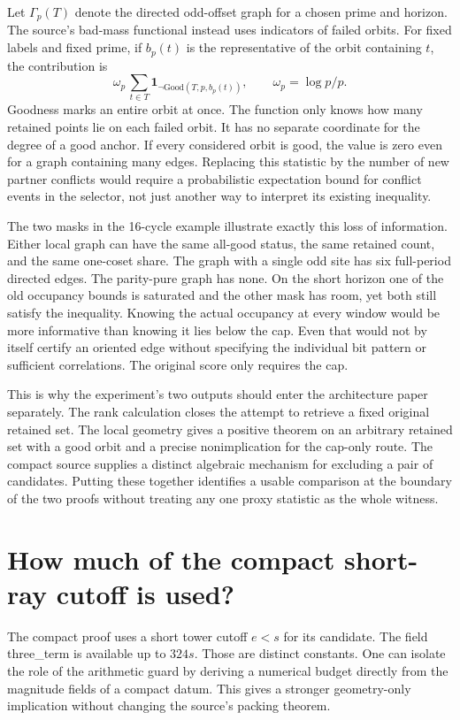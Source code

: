 \documentclass[12pt,letterpaper]{article}
\DeclareRobustCommand{\id}[1]{\mbox{\small\ttfamily #1}}
\begin{document}
Let \(\Gamma_p(T)\) denote the directed odd-offset graph for a chosen prime and horizon. The source's bad-mass functional instead uses indicators of failed orbits. For fixed labels and fixed prime, if \(b_p(t)\) is the representative of the orbit containing \(t\), the contribution is
\[
   \omega_p\,\sum_{t\in T}
                \mathbf1_{\neg\mathrm{Good}(T,p,b_p(t))},
                \qquad \omega_p=\log p/p .
\]
Goodness marks an entire orbit at once. The function only knows how many retained points lie on each failed orbit. It has no separate coordinate for the degree of a good anchor. If every considered orbit is good, the value is zero even for a graph containing many edges. Replacing this statistic by the number of new partner conflicts would require a probabilistic expectation bound for conflict events in the selector, not just another way to interpret its existing inequality.

The two masks in the 16-cycle example illustrate exactly this loss of information. Either local graph can have the same all-good status, the same retained count, and the same one-coset share. The graph with a single odd site has six full-period directed edges. The parity-pure graph has none. On the short horizon one of the old occupancy bounds is saturated and the other mask has room, yet both still satisfy the inequality. Knowing the actual occupancy at every window would be more informative than knowing it lies below the cap. Even that would not by itself certify an oriented edge without specifying the individual bit pattern or sufficient correlations. The original score only requires the cap.

This is why the experiment's two outputs should enter the architecture paper separately. The rank calculation closes the attempt to retrieve a fixed original retained set. The local geometry gives a positive theorem on an arbitrary retained set with a good orbit and a precise nonimplication for the cap-only route. The compact source supplies a distinct algebraic mechanism for excluding a pair of candidates. Putting these together identifies a usable comparison at the boundary of the two proofs without treating any one proxy statistic as the whole witness.

\section{How much of the compact short-ray cutoff is used?}
\label{sec:newbudget}

The compact proof uses a short tower cutoff \(e<s\) for its candidate. The field \id{three\_term} is available up to \(324s\). Those are distinct constants. One can isolate the role of the arithmetic guard by deriving a numerical budget directly from the magnitude fields of a compact datum. This gives a stronger geometry-only implication without changing the source's packing theorem.
\end{document}
